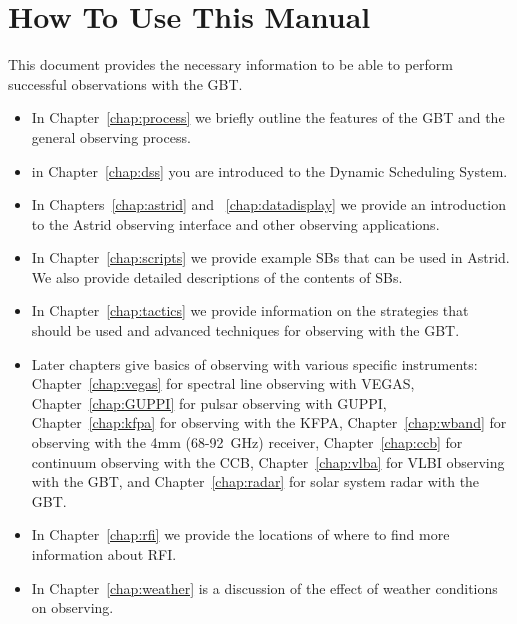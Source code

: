 \chapter{How To Use This Manual}

This document provides the necessary information to be able to perform 
successful observations with the \gls{GBT}.
\begin{itemize}

\item In Chapter~\ref{chap:process} we briefly outline the features of the
\gls{GBT} and the general observing process.

\item in Chapter~\ref{chap:dss} you are introduced to the Dynamic Scheduling
System.

\item In Chapters~\ref{chap:astrid} and ~\ref{chap:datadisplay} we provide an
introduction to the \gls{Astrid} observing interface and other
observing applications.

\item In Chapter~\ref{chap:scripts} we provide example \glspl{SB} that can 
be used in \gls{Astrid}.  We also provide detailed descriptions of the contents
of \glspl{SB}.

\item In Chapter~\ref{chap:tactics} we provide information on the strategies
that should be used and advanced techniques for observing with the \gls{GBT}.

\item Later chapters give basics of observing with various specific instruments:
Chapter~\ref{chap:vegas} for spectral line observing with \gls{VEGAS},
Chapter~\ref{chap:GUPPI} for pulsar observing with \gls{GUPPI},
Chapter~\ref{chap:kfpa} for observing with the \gls{KFPA},
Chapter~\ref{chap:wband} for observing with the 4mm (68-92~GHz) receiver,
Chapter~\ref{chap:ccb} for continuum observing with the \gls{CCB},
Chapter~\ref{chap:vlba} for \gls{VLBI} observing with the \gls{GBT}, and
Chapter~\ref{chap:radar} for solar system radar with the \gls{GBT}.

\item In Chapter~\ref{chap:rfi} we provide the locations of where to find more 
information about \gls{RFI}.

\item In Chapter~\ref{chap:weather} is a discussion of the effect of weather
conditions on observing.


\end{itemize}
